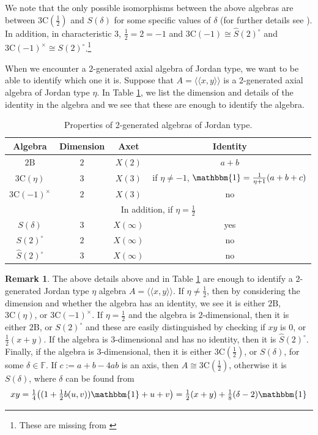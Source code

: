 \documentclass[11pt, a4paper]{article}
\theoremstyle{plain}
\theoremstyle{definition}
\newtheorem{remark}[theorem]{Remark}
\newcommand\dl{\delta}
\newcommand\lla{\langle\!\langle}
\newcommand\rra{\rangle\!\rangle}
\newcommand\FF{\mathbb{F}}
\newcommand{\B}{\mathrm{B}}
\newcommand{\C}{\mathrm{C}}
\newcommand{\Cl}{\widehat{S}(2)^\circ} %
\newcommand{\0}{\overline{0}}
\newcommand{\2}{\overline{2}}
\newcommand{\1}{\mathbbm{1}}
\begin{document}
We note that the only possible isomorphisms between the above algebras are between $3\C(\frac{1}{2})$ and $S(\dl)$ for some specific values of $\dl$ (for further details see \cite[Remark 5.9]{forbidden}).  In addition, in characteristic $3$, $\frac{1}{2} = 2 = -1$ and $3\C(-1) \cong \Cl$ and $3\C(-1)^\times \cong S(2)^\circ$.\footnote{These are missing from \cite{forbidden}}

When we encounter a $2$-generated axial algebra of Jordan type, we want to be able to identify which one it is.  Suppose that $A = \lla x,y \rra$ is a $2$-generated axial algebra of Jordan type $\eta$.  In Table \ref{tab:2gen Jordan Table}, we list the dimension and details of the identity in the algebra and we see that these are enough to identify the algebra.

\begin{table}[h!tb]
	\centering
	\renewcommand{\arraystretch}{1.2}
	\begin{tabular}{c|c|c|c}
		Algebra & Dimension & Axet & Identity \\
		\hline
		$2\B$ & $2$ &  $X(2)$ & $a+b$ \\ 
		$3\C(\eta)$ & 3 & $X(3)$ & if $\eta \neq -1$, $\1 = \frac{1}{\eta+1}(a+b+c)$ \\ 
		$3\C(-1)^\times$ & $2$ &  $X(3)$ & no \\ 
		\hline
		\multicolumn{4}{c}{In addition, if $\eta = \frac{1}{2}$} \\
		\hline
		$S(\delta)$ & $3$ & $X(\infty)$ & yes \\ 
		$S(2)^\circ$ & $2$ & $X(\infty)$  &  no \\ 
		$\Cl$ & $3$ & $X(\infty)$ & no \\ 
		\hline
	\end{tabular}
	\caption{Properties of 2-generated algebras of Jordan type.}
	\label{tab:2gen Jordan Table}
\end{table}

\begin{remark}\label{idJordan}
The above details above and in Table \ref{tab:2gen Jordan Table} are enough to identify a $2$-generated Jordan type $\eta$ algebra $A = \lla x, y \rra$.  If $\eta \neq \frac{1}{2}$, then by considering the dimension and whether the algebra has an identity, we see it is either $2\B$, $3\C(\eta)$, or $3\C(-1)^\times$.  If $\eta = \frac{1}{2}$ and the algebra is $2$-dimensional, then it is either $2\B$, or $S(2)^\circ$ and these are easily distinguished by checking if $xy$ is $0$, or $\frac{1}{2}(x+y)$.  If the algebra is $3$-dimensional and has no identity, then it is $\Cl$.  Finally, if the algebra is $3$-dimensional, then it is either $3\C(\frac{1}{2})$, or $S(\dl)$, for some $\dl \in \FF$.   If $c := a+b - 4ab$ is an axis, then $A \cong 3\C(\frac{1}{2})$, otherwise it is $S(\dl)$, where $\dl$ can be found from
\[
xy = \tfrac{1}{4}\big( (1 + \tfrac{1}{2}b(u, v))\1 + u + v \big)= \tfrac{1}{2}(x + y) + \tfrac{1}{8}(\dl - 2)\1
\]
\end{remark}
\end{document}
